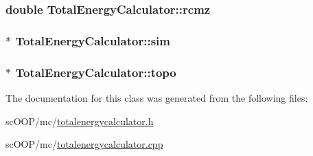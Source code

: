 \hypertarget{class_total_energy_calculator_acbaf4435cba069d4284cbeaedbbba208}{
\subsubsection[{rcmz}]{\setlength{\rightskip}{0pt plus 5cm}double Total\+Energy\+Calculator\+::rcmz\hspace{0.3cm}{\ttfamily [private]}}}\label{class_total_energy_calculator_acbaf4435cba069d4284cbeaedbbba208}
\hypertarget{class_total_energy_calculator_abc83a6fe12e76bdbff49d40667819edc}{
\subsubsection[{sim}]{$\ast$ Total\+Energy\+Calculator\+::sim\hspace{0.3cm}{\ttfamily [private]}}}\label{class_total_energy_calculator_abc83a6fe12e76bdbff49d40667819edc}
\hypertarget{class_total_energy_calculator_aed85fe4b47789143751a8da4f533e615}{
\subsubsection[{topo}]{$\ast$ Total\+Energy\+Calculator\+::topo\hspace{0.3cm}{\ttfamily [private]}}}\label{class_total_energy_calculator_aed85fe4b47789143751a8da4f533e615}


The documentation for this class was generated from the following files\+:\begin{DoxyCompactItemize}
\item 
sc\+O\+O\+P/mc/\hyperlink{totalenergycalculator_8h}{totalenergycalculator.\+h}\item 
sc\+O\+O\+P/mc/\hyperlink{totalenergycalculator_8cpp}{totalenergycalculator.\+cpp}\end{DoxyCompactItemize}
